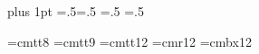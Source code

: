 %


\Gpdffalse \Gdvipdffalse        %
\parskip=0pt plus 1pt
\parindent=18pt
\abovedisplayskip=.5\abovedisplayskip  \belowdisplayskip=.5\belowdisplayskip
\abovedisplayshortskip=.5\abovedisplayshortskip
\belowdisplayshortskip=.5\belowdisplayshortskip

\font\eighttt=cmtt8
\font\ninett=cmtt9
\font\twelvett=cmtt12
\font\authorfont=cmr12
\font\sectionfont=cmbx12

\def\cw#1{{\tt #1}}
\def\bs{\char92 }                              %
\def\rn#1{$\langle\,${\it #1\/}$\,\rangle$}    %

\def\chapter#1{\penalty-500\bigskip
  \centerline{\sectionfont\def\.##1{{\twelvett##1}}#1}\nobreak\vskip 6pt}
\def\section#1{\medskip\noindent{\bf #1.}\enspace\ignorespaces}

\def\bull{\smallskip\item{$\bullet$}}

\def\begincode{\par\medskip\begingroup
  \def\do##1{\catcode`##1=12 }\dospecials
  \catcode`\|=0
  \obeylines \obeyspaces \tt \parindent=0pt \leftskip=\parindent\relax}
\def\endcode{\endgroup\medskip\noindent}

\def\runninghead{{\ninett GWEB} USER MANUAL (VERSION 0.8.5)}
\def\lheader{\mainfont\folio\hfil{\sc\runninghead}\hfil}
\def\rheader{\hfil{\sc\runninghead}\hfil\mainfont\folio}

